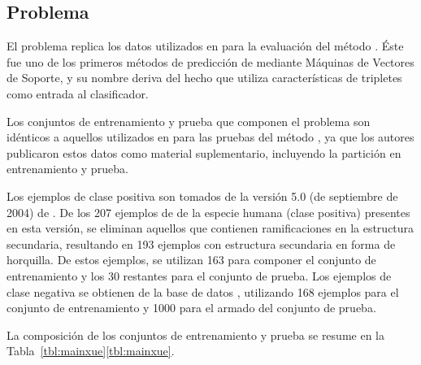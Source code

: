 %
%
\subsection{Problema \tripletsvm}
%
El problema \prob{\tripletsvm} replica los datos utilizados
en \cite{xue} para la evaluación del método \work{\tripletsvm}.
Éste fue uno de los primeros métodos de predicción de 
mediante Máquinas de Vectores de Soporte, y su nombre deriva del hecho
que utiliza características de tripletes como entrada al clasificador.

Los conjuntos de entrenamiento y prueba que componen el problema
\prob{\tripletsvm} son idénticos a aquellos utilizados en \cite{xue}
para las pruebas del método \work{\tripletsvm}, ya que los autores
publicaron estos datos como material suplementario, incluyendo la
partición en entrenamiento y prueba.

Los ejemplos de clase positiva son tomados de la versión 5.0 (de
septiembre de 2004) de \work\mirbase.
De los 207 ejemplos de  de la especie humana (clase
positiva) presentes en esta versión, se eliminan aquellos que
contienen ramificaciones en la estructura secundaria, resultando en
193 ejemplos con estructura secundaria en forma de horquilla.
De estos ejemplos, se utilizan 163 para componer el conjunto de
entrenamiento y los 30 restantes para el conjunto de prueba.
Los ejemplos de clase negativa se obtienen de la base de datos
 \cite{xue}, utilizando 168 ejemplos para el conjunto de
entrenamiento y 1000 para el armado del conjunto de prueba.

La composición de los conjuntos de entrenamiento y prueba se resume en
la \iflatexml{}Tabla~\ref{tbl:mainxue}\else\autoref{tbl:mainxue}\fi.
